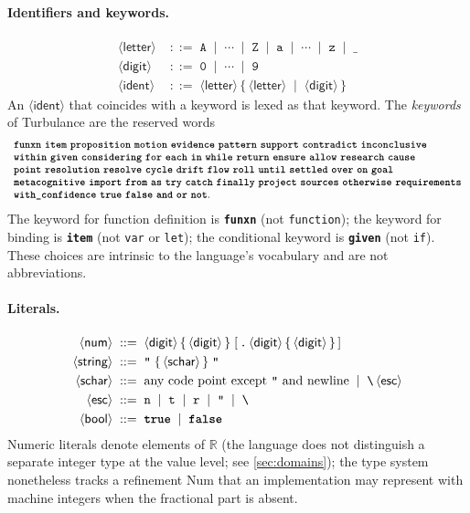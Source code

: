 \documentclass[11pt,a4paper]{article}
\theoremstyle{plain}
\theoremstyle{definition}
\theoremstyle{remark}
\newcommand{\nt}[1]{\ensuremath{\langle\textsf{#1}\rangle}}  %
\newcommand{\tm}[1]{\textbf{\texttt{#1}}}                 %
\newcommand{\opt}[1]{\ensuremath{[\,#1\,]}}               %
\newcommand{\rep}[1]{\ensuremath{\{\,#1\,\}}}             %
\newcommand{\bnfeq}{\;::=\;}
\newcommand{\bnfor}{\;\mid\;}
\begin{document}
\paragraph{Identifiers and keywords.}
\begin{align*}
\nt{letter}     &\bnfeq \texttt{A}\bnfor\cdots\bnfor\texttt{Z}\bnfor
                        \texttt{a}\bnfor\cdots\bnfor\texttt{z}\bnfor\texttt{\_}\\
\nt{digit}      &\bnfeq \texttt{0}\bnfor\cdots\bnfor\texttt{9}\\
\nt{ident}      &\bnfeq \nt{letter}\,\rep{\nt{letter}\bnfor\nt{digit}}
\end{align*}
An \nt{ident} that coincides with a keyword is lexed as that keyword. The
\emph{keywords} of Turbulance are the reserved words
\[
\begin{array}{l}
\tm{funxn}\ \tm{item}\ \tm{proposition}\ \tm{motion}\ \tm{evidence}\
\tm{pattern}\ \tm{support}\ \tm{contradict}\ \tm{inconclusive}\\
\tm{within}\ \tm{given}\ \tm{considering}\ \tm{for}\ \tm{each}\ \tm{in}\
\tm{while}\ \tm{return}\ \tm{ensure}\ \tm{allow}\ \tm{research}\ \tm{cause}\\
\tm{point}\ \tm{resolution}\ \tm{resolve}\ \tm{cycle}\ \tm{drift}\ \tm{flow}\
\tm{roll}\ \tm{until}\ \tm{settled}\ \tm{over}\ \tm{on}\ \tm{goal}\\
\tm{metacognitive}\ \tm{import}\ \tm{from}\ \tm{as}\ \tm{try}\ \tm{catch}\
\tm{finally}\ \tm{project}\ \tm{sources}\ \tm{otherwise}\
\tm{requirements}\\
\tm{with\_confidence}\ \tm{true}\ \tm{false}\ \tm{and}\ \tm{or}\ \tm{not}.
\end{array}
\]
The keyword for function definition is \tm{funxn} (not \texttt{function}); the
keyword for binding is \tm{item} (not \texttt{var} or \texttt{let}); the
conditional keyword is \tm{given} (not \texttt{if}). These choices are
intrinsic to the language's vocabulary and are not abbreviations.

\paragraph{Literals.}
\begin{align*}
\nt{num}    &\bnfeq \nt{digit}\,\rep{\nt{digit}}\;
                    \opt{\texttt{.}\,\nt{digit}\,\rep{\nt{digit}}}\\
\nt{string} &\bnfeq \texttt{"}\;\rep{\nt{schar}}\;\texttt{"}\\
\nt{schar}  &\bnfeq \text{any code point except \texttt{"} and newline}
                    \bnfor \texttt{\textbackslash}\,\nt{esc}\\
\nt{esc}    &\bnfeq \texttt{n}\bnfor\texttt{t}\bnfor\texttt{r}\bnfor
                    \texttt{"}\bnfor\texttt{\textbackslash}\\
\nt{bool}   &\bnfeq \tm{true}\bnfor\tm{false}
\end{align*}
Numeric literals denote elements of $\mathbb{R}$ (the language does not
distinguish a separate integer type at the value level; see
\cref{sec:domains}); the type system nonetheless tracks a refinement
\textsf{Num} that an implementation may represent with machine integers when
the fractional part is absent.
\end{document}
